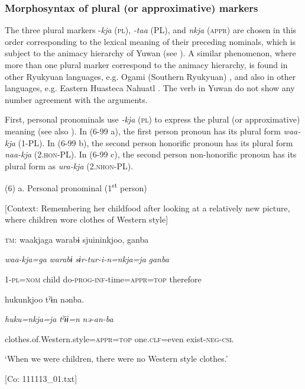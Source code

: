 \subsubsection{Morphosyntax of plural (or approximative) markers}

The three plural markers -\textit{kja} (\textsc{pl}), \textit{{}-taa} (PL), and \textit{nkja} (\textsc{appr}) are chosen in this order corresponding to the lexical meaning of their preceding nominals, which is subject to the animacy hierarchy of Yuwan (see ). A similar phenomenon, where more than one plural marker correspond to the animacy hierarchy, is found in other Ryukyuan languages, e.g. Ogami (Southern Ryukyuan) \citep[133]{Pellard2010}, and also in other languages, e.g. Eastern Huasteca Nahuatl \citep[77-78]{Corbett2000}. The verb in Yuwan do not show any number agreement with the arguments.

First, personal pronominals use \textit{{}-kja} (\textsc{pl}) to express the plural (or approximative) meaning (see also ). In (6-99 a), the first person pronoun has its plural form \textit{waa-kja} (1-PL). In (6-99 b), the second person honorific pronoun has its plural form \textit{naa-kja} (2.\textsc{hon}-PL). In (6-99 c), the second person non-honorific pronoun has its plural form as \textit{ura-kja} (2.\textsc{nhon}-PL).

(6)  a.  Personal pronominal (1\textsuperscript{st} person)

    [Context: Remembering her childfood after looking at a relatively new picture, where children wore clothes of Western style]

    \textsc{tm}:  waakjaga  warabɨ  sjuininkjoo,  ganba

      \textit{waa-kja=ga}  \textit{warabɨ}  \textit{sɨr-tur-i-n=nkja=ja}  \textit{ganba}

      1-\textsc{pl}=\textsc{nom}  child  do-\textsc{prog}-\textsc{inf}-time=\textsc{appr}=\textsc{top}  therefore

      hukunkjoo  tˀɨn  nənba.

      \textit{huku=nkja=ja}  \textit{tˀɨɨ=n}  \textit{nə-an-ba}

      clothes.of.Western.style=\textsc{appr}=\textsc{top}  one.\textsc{clf}=even  exist-\textsc{neg}-\textsc{csl}

      ‘When we were children, there were no Western style clothes.’

      [Co: 111113\_01.txt]

